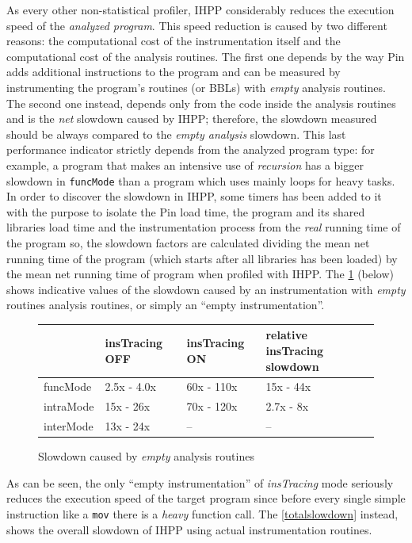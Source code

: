 \documentclass[a4paper,10pt]{report}
\begin{document}
As every other non-statistical profiler, IHPP considerably reduces the execution 
speed of the \emph{analyzed program}. This speed reduction is caused by two different 
reasons: the computational cost of the instrumentation itself and the computational
cost of the analysis routines. The first one depends by the way Pin
adds additional instructions to the program and can be measured by 
instrumenting the program's routines (or BBLs) with \emph{empty} analysis routines.
The second one instead, depends only from the code inside the analysis routines
and is the \emph{net} slowdown caused by IHPP; therefore, the 
slowdown measured should be always compared to the \emph{empty analysis} slowdown.
This last performance indicator strictly depends from the analyzed program type: 
for example, a program that makes an intensive use 
of \emph{recursion} has a bigger slowdown in \verb|funcMode|  
than a program which uses mainly loops for heavy tasks.
In order to discover the slowdown in IHPP, 
some timers has been added to it with the purpose to isolate
the Pin load time, the program and its shared libraries load time 
and the instrumentation process from the \emph{real} running time of the program
so, the slowdown factors are calculated dividing the mean net running time 
of the program (which starts after all libraries has been loaded) by the mean
net running time of program when profiled with IHPP.
The \cref{emptyslowdown} (below) shows indicative values of the slowdown 
caused by an instrumentation with \emph{empty} routines analysis routines, 
or simply an ``empty instrumentation''.

\begin{figure}[H]

\centering

{\renewcommand{\arraystretch}{1.2}
\renewcommand{\tabcolsep}{0.2cm}
\begin{tabular}{l|l|l|l}
& insTracing OFF & insTracing ON & relative insTracing slowdown\\
\hline
funcMode & 2.5x - 4.0x & 60x - 110x & 15x - 44x\\
intraMode & 15x - 26x & 70x - 120x & 2.7x - 8x\\
interMode & 13x - 24x & -- & --\\
\end{tabular}}


\caption{Slowdown caused by \emph{empty} analysis routines}
\label{emptyslowdown}
\end{figure}

\noindent
As can be seen, the only ``empty instrumentation'' of \emph{insTracing} mode 
seriously reduces the execution speed of the target program since 
before every single simple instruction like a \verb|mov| there is a \emph{heavy}
function call. The \cref{totalslowdown} instead, shows the overall slowdown of IHPP
using actual instrumentation routines.
\end{document}
